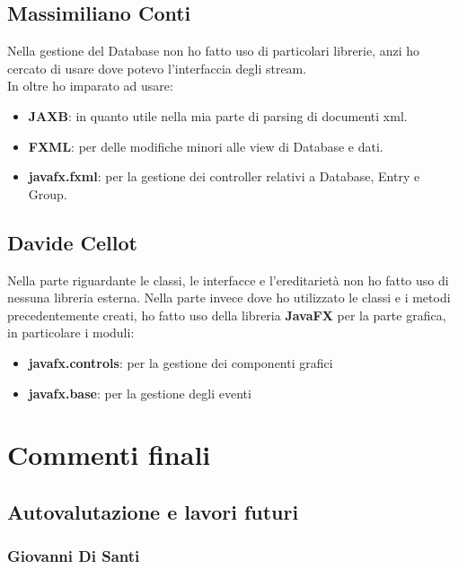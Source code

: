 \documentclass[a4paper,12pt]{report}
\begin{document}
\section*{Massimiliano Conti}
Nella gestione del Database non ho fatto uso di particolari librerie, anzi ho cercato di usare dove potevo l'interfaccia degli stream.\\
In oltre ho imparato ad usare:
\begin{itemize}
    \item \textbf{JAXB}: in quanto utile nella mia parte di parsing di documenti xml.
    \item \textbf{FXML}: per delle modifiche minori alle view di Database e dati.
    \item \textbf{javafx.fxml}: per la gestione dei controller relativi a Database, Entry e Group.
\end{itemize}

\section*{Davide Cellot}
Nella parte riguardante le classi, le interfacce e l’ereditarietà non ho fatto uso di nessuna libreria esterna. Nella parte invece dove ho utilizzato le classi e i metodi precedentemente creati, ho fatto uso della libreria \textbf{JavaFX} per la parte grafica, in particolare i moduli:\\
\begin{itemize}
    \item \textbf{javafx.controls}: per la gestione dei componenti grafici
    \item \textbf{javafx.base}: per la gestione degli eventi
\end{itemize}


\chapter{Commenti finali}

\section{Autovalutazione e lavori futuri}

\subsection*{Giovanni Di Santi}
\end{document}
